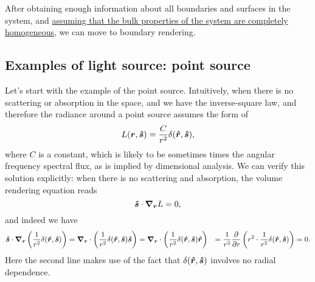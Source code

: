 \documentclass[hyperref, a4paper]{article}
\def\\{}%
\begin{document}
After obtaining enough information about all boundaries and surfaces in the system,
and \ul{assuming that the bulk properties of the system are completely homogeneous},
we can move to boundary rendering. 

\subsection{Examples of light source: point source}

Let's start with the example of the point source.
Intuitively, when there is no scattering or absorption in the space,
and we have the inverse-square law,
and therefore the radiance around a point source assumes the form of 
\begin{equation}
    L(\vb*{r}, \vu*{s}) = \frac{C}{r^2} \delta(\vu*{r}, \vu*{s}),
\end{equation} 
where $C$ is a constant, which is likely to be 
sometimes times the angular frequency spectral flux,
as is implied by dimensional analysis.
We can verify this solution explicitly: 
when there is no scattering and absorption, 
the volume rendering equation reads 
\begin{equation}
    \vu*{s} \cdot \grad_{\vb*{r}} L = 0,
    \label{eq:trivial-bulk-re}
\end{equation}
and indeed we have  
\begin{equation}
    \begin{aligned}
        \vu*{s} \cdot \grad_{\vb*{r}} \left(\frac{1}{r^2} \delta(\vu*{r}, \vu*{s})\right) &= 
        \grad_{\vb*{r}} \cdot \left(
            \frac{1}{r^2} \delta(\vu*{r}, \vu*{s}) \vu*{s}
        \right) 
        = \grad_{\vb*{r}} \cdot \left(
            \frac{1}{r^2} \delta(\vu*{r}, \vu*{s}) \vu*{r}
        \right) \\
        &= \frac{1}{r^2} \pdv{r} \left(
            r^2 \cdot \frac{1}{r^2} \delta(\vu*{r}, \vu*{s})
        \right) = 0.
    \end{aligned}
    \label{eq:inverse-square-is-solution}
\end{equation}
Here the second line makes use of the fact 
that $\delta(\vu*{r}, \vu*{s})$ involves no radial dependence.
\end{document}
